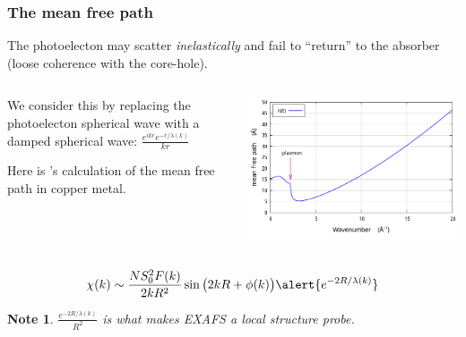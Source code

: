 \documentclass[10pt, xcolor=x11names, compress]{beamer}
\newtheorem{notethis}[theorem]{Note}
\begin{document}
\begin{frame}
  \frametitle{The mean free path}
  The photoelecton may scatter \textit{inelastically} and fail to
  ``return'' to the absorber (loose coherence with the core-hole).

  \medskip

  \begin{columns}
    \begin{column}{0.5\linewidth}
      We consider this by replacing the photoelecton spherical wave
      with a damped spherical wave:
      $\frac{e^{ikr}e^{-r/\lambda(k)}}{kr}$

      \medskip

      Here is {\feff}'s calculation of the mean free path in copper
      metal.
    \end{column}
    \begin{column}{0.5\linewidth}
      \includegraphics[width=\linewidth]{images/mfp.png}
    \end{column}
  \end{columns}
  \begin{equation}
    \chi(k) \sim \frac{NS_0^2F(k)}{2kR^2}\sin\big(2kR+\phi(k)\big)
    \alert{e^{-2R/\lambda(k)}}
    \notag
  \end{equation}
  \begin{notethis}
    $\frac{e^{-2R/\lambda(k)}}{R^2}$ is what makes EXAFS a \alert{local}
    structure probe.
  \end{notethis}
\end{frame}
\end{document}
